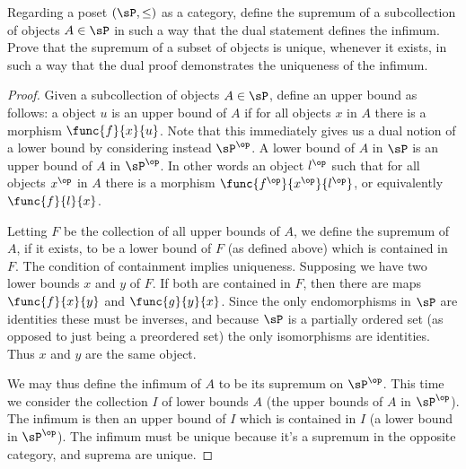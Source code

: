 \documentclass[main.tex]{subfiles}
\begin{document}
\begin{exercise}
	Regarding a poset \((\sP,\le)\) as a category, define the supremum of a
	subcollection of objects \(A\in\sP\) in such a way that the dual
	statement defines the infimum. Prove that the supremum of a subset of
	objects is unique, whenever it exists, in such a way that the dual proof
	demonstrates the uniqueness of the infimum.
\end{exercise}
\begin{proof}
	Given a subcollection of objects \(A\in\sP\), define an upper bound as
	follows: a object \(u\) is an upper bound of \(A\) if for all objects \(x\)
	in \(A\) there is a morphism \(\func{f}{x}{u}\). Note that this immediately
	gives us a dual notion of a lower bound by considering instead
	\(\sP^\op\). A lower bound of \(A\) in \(\sP\) is an upper bound of \(A\) in
	\(\sP^\op\). In other words an object \(l^\op\) such that for all objects
	\(x^\op\) in \(A\) there is a morphism \(\func{f^\op}{x^\op}{l^\op}\), or
	equivalently \(\func{f}{l}{x}\).

	Letting \(F\) be the collection of all upper bounds of \(A\), we define the
	supremum of \(A\), if it exists, to be a lower bound of \(F\) (as defined
	above) which is contained in \(F\). The condition of containment implies
	uniqueness. Supposing we have two lower bounds \(x\) and \(y\) of \(F\). If
	both are contained in \(F\), then there are maps \(\func{f}{x}{y}\) and
	\(\func{g}{y}{x}\). Since the only endomorphisms in \(\sP\) are identities
	these must be inverses, and because \(\sP\) is a partially ordered set (as
	opposed to just being a preordered set) the only isomorphisms are
	identities. Thus \(x\) and \(y\) are the same object.

	We may thus define the infimum of \(A\) to be its supremum on \(\sP^\op\).
	This time we consider the collection \(I\) of lower bounds \(A\) (the upper
	bounds of \(A\) in \(\sP^\op\)). The infimum is then an upper bound of \(I\)
	which is contained in \(I\) (a lower bound in \(\sP^\op\)). The infimum must
	be unique because it's a supremum in the opposite category, and suprema are
	unique.
\end{proof}
\end{document}

